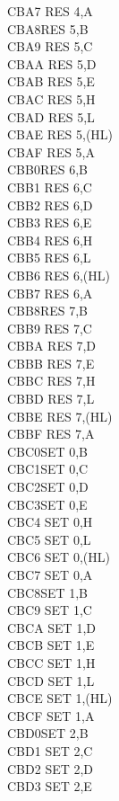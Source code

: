 \begin{multicols}{3}
{\begin{tabbing}
	CBA7\> 	RES 4,A\\
	CBA8\>RES 5,B\\
	CBA9\> 	RES 5,C\\
	CBAA\> 	RES 5,D\\
	CBAB\> 	RES 5,E\\
	CBAC\> 	RES 5,H\\
	CBAD\> 	RES 5,L\\
	CBAE\> 	RES 5,(HL)\\
	CBAF\> 	RES 5,A\\
	CBB0\>RES 6,B\\
	CBB1\> 	RES 6,C\\
	CBB2\> 	RES 6,D\\
	CBB3\> 	RES 6,E\\
	CBB4\> 	RES 6,H\\
	CBB5\> 	RES 6,L\\
	CBB6\> 	RES 6,(HL)\\
	CBB7\> 	RES 6,A\\
	CBB8\>RES 7,B\\
	CBB9\> 	RES 7,C\\
	CBBA\> 	RES 7,D\\
	CBBB\> 	RES 7,E\\
	CBBC\> 	RES 7,H\\
	CBBD\> 	RES 7,L\\
	CBBE\> 	RES 7,(HL)\\
	CBBF\> 	RES 7,A\\
	CBC0\>SET 0,B\\
	CBC1\>SET 0,C\\
	CBC2\>SET 0,D\\
	CBC3\>SET 0,E\\
	CBC4\> 	SET 0,H\\
	CBC5\> 	SET 0,L\\
	CBC6\> 	SET 0,(HL)\\
	CBC7\> 	SET 0,A\\
	CBC8\>SET 1,B\\
	CBC9\> 	SET 1,C\\
	CBCA\> 	SET 1,D\\
	CBCB\> 	SET 1,E\\
	CBCC\> 	SET 1,H\\
	CBCD\> 	SET 1,L\\
	CBCE\> 	SET 1,(HL)\\
	CBCF\> 	SET 1,A\\
	CBD0\>SET 2,B\\
	CBD1\> 	SET 2,C\\
	CBD2\> 	SET 2,D\\
	CBD3\> 	SET 2,E\\

\end{tabbing}}
\end{multicols}
